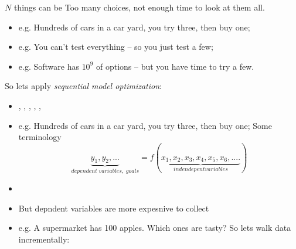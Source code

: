\documentclass[twocolumn,landscape]{book}
\begin{document}
$N$ things can be 
Too many choices, not enough time to look at them all.
\begin{itemize}
\item e.g. Hundreds of cars in a car yard, you try three, then buy one;
\item e.g. You can't test everything -- so you just test a few;
\item e.g. Software has $10^9$ of options -- but you  have time to try a few.
\end{itemize}
So lets apply {\em sequential model optimization}:
\begin{itemize}
\item \citet{xia2020sequential}, 
\citet{hutter2011sequential},
\citet{nair2018finding},
\citet{hsu2018arrow},
\citet{mockus1989bayesian},
\citet{golovin17}



\item e.g. Hundreds of cars in a car yard, you try three, then buy one;
Some terminology
\[ \underbrace{y_1,y_2,...}_{\mathit{}dependent\;variables,\;goals} = f(\underbrace{x_1, x_2, x_3, x_4, x_5, x_6,....}_{\mathit{indendepent variables}})
\]
\end{itemize}
\begin{itemize}
\item 
\item But depndent variables are more expesnive to collect 
\item e.g. A supermarket has 100 apples. Which ones are tasty?
So lets walk data incrementally:
\end{itemize}
\end{document}

